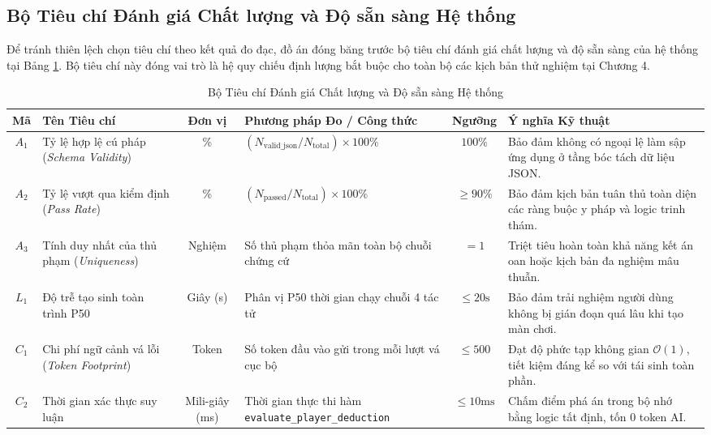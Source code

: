 \subsection{Bộ Tiêu chí Đánh giá Chất lượng và Độ sẵn sàng Hệ thống}
Để tránh thiên lệch chọn tiêu chí theo kết quả đo đạc, đồ án đóng băng trước bộ tiêu chí đánh giá chất lượng và độ sẵn sàng của hệ thống tại Bảng \ref{tab:predefined_criteria}. Bộ tiêu chí này đóng vai trò là hệ quy chiếu định lượng bắt buộc cho toàn bộ các kịch bản thử nghiệm tại Chương 4.

\begin{table}[H]
\centering
\small
\setlength{\tabcolsep}{4pt}
\caption{Bộ Tiêu chí Đánh giá Chất lượng và Độ sẵn sàng Hệ thống}
\label{tab:predefined_criteria}
\begin{tabularx}{\textwidth}{c p{2.5cm} c p{3.2cm} c X}
\toprule
\textbf{Mã} & \textbf{Tên Tiêu chí} & \textbf{Đơn vị} & \textbf{Phương pháp Đo / Công thức} & \textbf{Ngưỡng} & \textbf{Ý nghĩa Kỹ thuật} \\
\midrule
$A_1$ & Tỷ lệ hợp lệ cú pháp (\textit{Schema Validity}) & \% & $(N_{\text{valid\_json}} / N_{\text{total}}) \times 100\%$ & $100\%$ & Bảo đảm không có ngoại lệ làm sập ứng dụng ở tầng bóc tách dữ liệu JSON. \\
$A_2$ & Tỷ lệ vượt qua kiểm định (\textit{Pass Rate}) & \% & $(N_{\text{passed}} / N_{\text{total}}) \times 100\%$ & $\ge 90\%$ & Bảo đảm kịch bản tuân thủ toàn diện các ràng buộc y pháp và logic trinh thám. \\
$A_3$ & Tính duy nhất của thủ phạm (\textit{Uniqueness}) & Nghiệm & Số thủ phạm thỏa mãn toàn bộ chuỗi chứng cứ & $= 1$ & Triệt tiêu hoàn toàn khả năng kết án oan hoặc kịch bản đa nghiệm mâu thuẫn. \\
$L_1$ & Độ trễ tạo sinh toàn trình P50 & Giây (s) & Phân vị P50 thời gian chạy chuỗi 4 tác tử & $\le 20\text{s}$ & Bảo đảm trải nghiệm người dùng không bị gián đoạn quá lâu khi tạo màn chơi. \\
$C_1$ & Chi phí ngữ cảnh vá lỗi (\textit{Token Footprint}) & Token & Số token đầu vào gửi trong mỗi lượt vá cục bộ & $\le 500$ & Đạt độ phức tạp không gian $\mathcal{O}(1)$, tiết kiệm đáng kể so với tái sinh toàn phần. \\
$C_2$ & Thời gian xác thực suy luận & Mili-giây (ms) & Thời gian thực thi hàm \newline \texttt{evaluate\_player\_deduction} & $\le 10\text{ms}$ & Chấm điểm phá án trong bộ nhớ bằng logic tất định, tốn 0 token AI. \\
\bottomrule
\end{tabularx}
\end{table}

